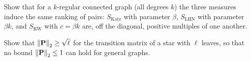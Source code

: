 \begin{notechapter}
\begin{exercise}\label{node-similarity:exr:4}
Show that for a $k$-regular connected graph (all degrees $k$) the three measures induce the same ranking of pairs: $S_{\text{Katz}}$ with parameter $\beta$, $S_{\text{LHN}}$ with parameter $\beta k$, and $S_{\text{RW}}$ with $c = \beta k$ are, off the diagonal, positive multiples of one another.
\end{exercise}

\begin{exercise}\label{node-similarity:exr:5}
Show that $\left\|\mathbf{P}\right\|_2 \ge \sqrt{\ell}$ for the transition matrix of a star with $\ell$ leaves, so that no bound $\left\|\mathbf{P}\right\|_2 \le 1$ can hold for general graphs.
\end{exercise}
\end{notechapter}
